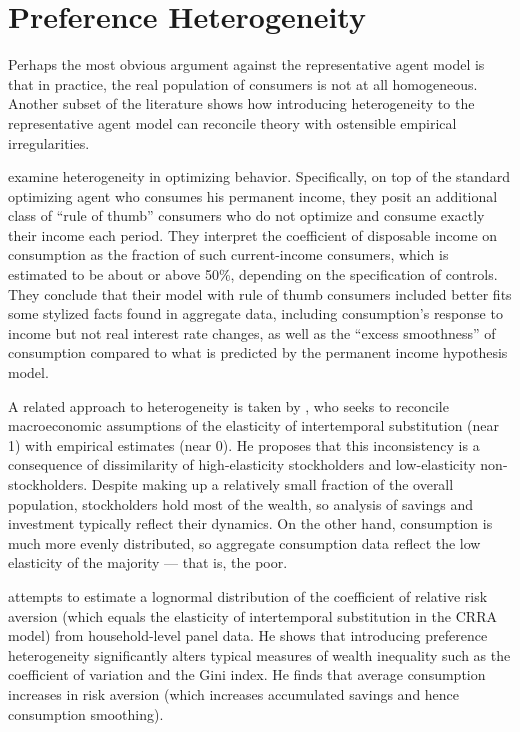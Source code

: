 \documentclass{hw}
\begin{document}
\section{Preference Heterogeneity}
Perhaps the most obvious argument against the representative agent model is that in practice, the real population of consumers is not at all homogeneous. Another subset of the literature shows how introducing heterogeneity to the representative agent model can reconcile theory with ostensible empirical irregularities.

\cite{campbell89} examine heterogeneity in optimizing behavior. Specifically, on top of the standard optimizing agent who consumes his permanent income, they posit an additional class of ``rule of thumb'' consumers who do not optimize and consume exactly their income each period. They interpret the coefficient of disposable income on consumption as the fraction of such current-income consumers, which is estimated to be about or above 50\%, depending on the specification of controls. They conclude that their model with rule of thumb consumers included better fits some stylized facts found in aggregate data, including consumption's response to income but not real interest rate changes, as well as the ``excess smoothness'' of consumption compared to what is predicted by the permanent income hypothesis model.

A related approach to heterogeneity is taken by \cite{guvenen06}, who seeks to reconcile macroeconomic assumptions of the elasticity of intertemporal substitution (near 1) with empirical estimates (near 0). He proposes that this inconsistency is a consequence of dissimilarity of high-elasticity stockholders and low-elasticity non-stockholders. Despite making up a relatively small fraction of the overall population, stockholders hold most of the wealth, so analysis of savings and investment typically reflect their dynamics. On the other hand, consumption is much more evenly distributed, so aggregate consumption data reflect the low elasticity of the majority --- that is, the poor. 

\cite{cozzi14} attempts to estimate a lognormal distribution of the coefficient of relative risk aversion (which equals the elasticity of intertemporal substitution in the CRRA model) from household-level panel data. He shows that introducing preference heterogeneity significantly alters typical measures of wealth inequality such as the coefficient of variation and the Gini index. He finds that average consumption increases in risk aversion (which increases accumulated savings and hence consumption smoothing).
\end{document}
